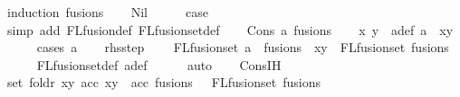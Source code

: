 \begin{isabellebody}
%
\isadelimproof
%
\endisadelimproof
%
\isatagproof
{}\isamarkupfalse%
\ {\isacharparenleft}{\kern0pt}induction\ fusions{\isacharparenright}{\kern0pt}\isanewline
\ \ \isamarkupfalse%
\ Nil\isanewline
\ \ \isamarkupfalse%
\ \isamarkupfalse%
\ {\isacharquery}{\kern0pt}case\isanewline
\ \ \ \ \isamarkupfalse%
\ {\isacharparenleft}{\kern0pt}simp\ add{\isacharcolon}{\kern0pt}\ FLfusion{\isacharunderscore}{\kern0pt}def\ FLfusion{\isacharunderscore}{\kern0pt}set{\isacharunderscore}{\kern0pt}def{\isacharparenright}{\kern0pt}\isanewline
{}\isamarkupfalse%
\isanewline
\ \ \isamarkupfalse%
\ {\isacharparenleft}{\kern0pt}Cons\ a\ fusions{\isacharparenright}{\kern0pt}\isanewline
\ \ \isamarkupfalse%
\ x\ y\ \ a{\isacharunderscore}{\kern0pt}def{\isacharcolon}{\kern0pt}\ {\isachardoublequoteopen}a\ {\isacharequal}{\kern0pt}\ {\isacharparenleft}{\kern0pt}x{\isacharcomma}{\kern0pt}y{\isacharparenright}{\kern0pt}{\isachardoublequoteclose}\isanewline
\ \ \ \ \isamarkupfalse%
\ {\isacharparenleft}{\kern0pt}cases\ a{\isacharparenright}{\kern0pt}\isanewline
\isanewline
\ \ \isamarkupfalse%
\ rhs{\isacharunderscore}{\kern0pt}step{\isacharcolon}{\kern0pt}\isanewline
\ \ \ \ {\isachardoublequoteopen}FLfusion{\isacharunderscore}{\kern0pt}set\ {\isacharparenleft}{\kern0pt}a\ {\isacharhash}{\kern0pt}\ fusions{\isacharparenright}{\kern0pt}\ {\isacharequal}{\kern0pt}\ {\isacharbraceleft}{\kern0pt}x{\isacharcomma}{\kern0pt}y{\isacharbraceright}{\kern0pt}\ {\isasymunion}\ FLfusion{\isacharunderscore}{\kern0pt}set\ fusions{\isachardoublequoteclose}\isanewline
\ \ \ \ \isamarkupfalse%
\ FLfusion{\isacharunderscore}{\kern0pt}set{\isacharunderscore}{\kern0pt}def\ a{\isacharunderscore}{\kern0pt}def\isanewline
\ \ \ \ \isamarkupfalse%
\ auto\isanewline
\isanewline
\ \ \isamarkupfalse%
\ Cons{\isachardot}{\kern0pt}IH\isanewline
\ \ \isamarkupfalse%
\ {\isachardoublequoteopen}set\ {\isacharparenleft}{\kern0pt}foldr\ {\isacharparenleft}{\kern0pt}{\isasymlambda}{\isacharparenleft}{\kern0pt}x{\isacharcomma}{\kern0pt}y{\isacharparenright}{\kern0pt}\ acc{\isachardot}{\kern0pt}\ {\isacharbrackleft}{\kern0pt}x{\isacharcomma}{\kern0pt}y{\isacharbrackright}{\kern0pt}\ {\isacharat}{\kern0pt}\ acc{\isacharparenright}{\kern0pt}\ fusions\ {\isacharbrackleft}{\kern0pt}{\isacharbrackright}{\kern0pt}{\isacharparenright}{\kern0pt}\ {\isacharequal}{\kern0pt}\ FLfusion{\isacharunderscore}{\kern0pt}set\ fusions{\isachardoublequoteclose}\isanewline

\end{isabellebody}
